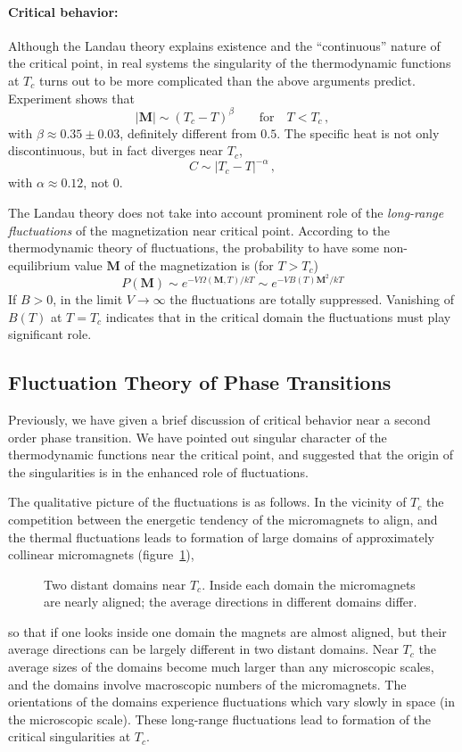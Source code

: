 \paragraph{Critical behavior:} Although the Landau theory explains existence and
the ``continuous'' nature of the critical point, in real systems the singularity
of the thermodynamic functions at $T_c$ turns out to be more complicated than the
above arguments predict. Experiment shows that
\[
|\mathbf M|\sim(T_c-T)^\beta\qquad\text{for}\quad T<T_c\,,
\]
with $\beta\approx0.35\pm0.03$, definitely different from $0.5$. The specific heat
is not only discontinuous, but in fact diverges near $T_c$,
\[
C\sim|T_c-T|^{-\alpha}\,,
\]
with $\alpha\approx0.12$, not 0.

The Landau theory does not take into account prominent role of the
\emph{long-range fluctuations} of the magnetization near critical point.
According to the thermodynamic theory of fluctuations, the probability to have
some non-equilibrium value $\mathbf M$ of the magnetization is (for $T>T_c$)
\[
P(\mathbf M)\sim e^{-V\Omega(\mathbf M,T)/kT}\sim e^{-VB(T)\mathbf M^2/kT}
\]
If $B>0$, in the limit $V\to\infty$ the fluctuations are totally suppressed.
Vanishing of $B(T)$ at $T=T_c$ indicates that in the critical domain the
fluctuations must play significant role.

\subsection*{Fluctuation Theory of Phase Transitions}

Previously, we have given a brief discussion of critical behavior near a second
order phase transition. We have pointed out singular character of the
thermodynamic functions near the critical point, and suggested that the origin of
the singularities is in the enhanced role of fluctuations.

The qualitative picture of the fluctuations is as follows. In the vicinity of
$T_c$ the competition between the energetic tendency of the micromagnets to
align, and the thermal fluctuations leads to formation of large domains of
approximately collinear micromagnets (figure~\ref{fig:domains}),
\begin{figure}[ht]
\centering{}
\caption{Two distant domains near $T_c$. Inside each domain the micromagnets are
nearly aligned; the average directions in different domains differ.}
\label{fig:domains}
\end{figure}
so that if one looks inside one domain the magnets are almost aligned, but their
average directions can be largely different in two distant domains. Near $T_c$
the average sizes of the domains become much larger than any microscopic scales,
and the domains involve macroscopic numbers of the micromagnets. The orientations
of the domains experience fluctuations which vary slowly in space (in the
microscopic scale). These long-range fluctuations lead to formation of the
critical singularities at $T_c$.

